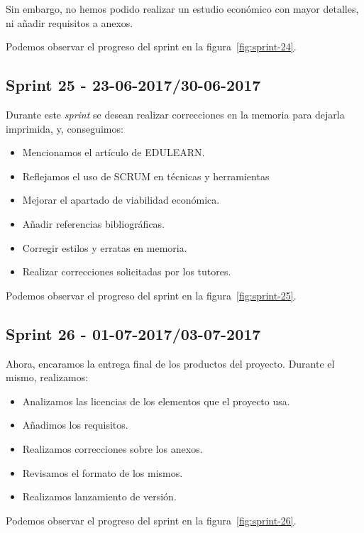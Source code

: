 Sin embargo, no hemos podido realizar un estudio económico con mayor detalles, ni añadir requisitos a anexos.

Podemos observar el progreso del sprint en la figura~\ref{fig:sprint-24}.

\subsection{Sprint 25 - 23-06-2017/30-06-2017}
Durante este \textit{sprint} se desean realizar correcciones en la memoria para dejarla imprimida, y, conseguimos:
\begin{itemize}
	\item Mencionamos el artículo de EDULEARN.
	\item Reflejamos el uso de SCRUM en técnicas y herramientas
	\item Mejorar el apartado de viabilidad económica.
	\item Añadir referencias bibliográficas.
	\item Corregir estilos y erratas en memoria.
	\item Realizar correcciones solicitadas por los tutores.
\end{itemize}

Podemos observar el progreso del sprint en la figura~\ref{fig:sprint-25}.

\subsection{Sprint 26 - 01-07-2017/03-07-2017}
Ahora, encaramos la entrega final de los productos del proyecto. Durante el mismo, realizamos:
\begin{itemize}
	\item Analizamos las licencias de los elementos que el proyecto usa.
	\item Añadimos los requisitos.
	\item Realizamos correcciones sobre los anexos.
	\item Revisamos el formato de los mismos.
	\item Realizamos lanzamiento de versión.
\end{itemize}

Podemos observar el progreso del sprint en la figura~\ref{fig:sprint-26}.

